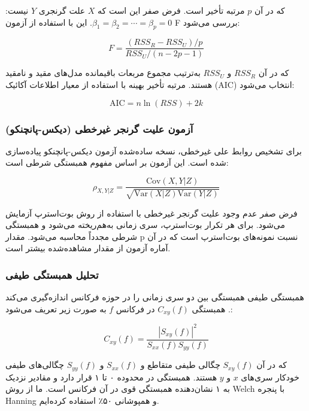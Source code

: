 \documentclass[12pt,a4paper,twocolumn]{article}
\begin{document}
که در آن $p$ مرتبه تأخیر است. فرض صفر این است که $X$ علت گرنجری $Y$ نیست: $\beta_1 = \beta_2 = \cdots = \beta_p = 0$. این با استفاده از آزمون F بررسی می‌شود:

\begin{equation}
F = \frac{(RSS_R - RSS_U) / p}{RSS_U / (n - 2p - 1)}
\end{equation}

که در آن $RSS_R$ و $RSS_U$ به‌ترتیب مجموع مربعات باقیمانده مدل‌های مقید و نامقید هستند. مرتبه تأخیر بهینه با استفاده از معیار اطلاعات آکائیک (AIC) انتخاب می‌شود:

\begin{equation}
\text{AIC} = n \ln(RSS) + 2k
\end{equation}

\subsubsection{آزمون علیت گرنجر غیرخطی (دیکس-پانچنکو)}

برای تشخیص روابط علی غیرخطی، نسخه ساده‌شده آزمون دیکس-پانچنکو \citep{diks2006} پیاده‌سازی شده است. این آزمون بر اساس مفهوم همبستگی شرطی است:

\begin{equation}
\rho_{X,Y|Z} = \frac{\text{Cov}(X, Y | Z)}{\sqrt{\text{Var}(X | Z) \text{Var}(Y | Z)}}
\end{equation}

فرض صفر عدم وجود علیت گرنجر غیرخطی با استفاده از روش بوت‌استرپ آزمایش می‌شود. برای هر تکرار بوت‌استرپ، سری زمانی به‌هم‌ریخته می‌شود و همبستگی شرطی مجدداً محاسبه می‌شود. مقدار p نسبت نمونه‌های بوت‌استرپ است که در آن آماره آزمون از مقدار مشاهده‌شده بیشتر است.

\subsubsection{تحلیل همبستگی طیفی}

همبستگی طیفی همبستگی بین دو سری زمانی را در حوزه فرکانس اندازه‌گیری می‌کند \citep{grinsted2004}. همبستگی $C_{xy}(f)$ در فرکانس $f$ به صورت زیر تعریف می‌شود:

\begin{equation}
C_{xy}(f) = \frac{|S_{xy}(f)|^2}{S_{xx}(f) S_{yy}(f)}
\end{equation}

که در آن $S_{xy}(f)$ چگالی طیفی متقاطع و $S_{xx}(f)$ و $S_{yy}(f)$ چگالی‌های طیفی خودکار سری‌های $x$ و $y$ هستند. همبستگی در محدوده ۰ تا ۱ قرار دارد و مقادیر نزدیک به ۱ نشان‌دهنده همبستگی قوی در آن فرکانس است. ما از روش Welch با پنجره Hanning و همپوشانی ۵۰٪ استفاده کرده‌ایم.
\end{document}
